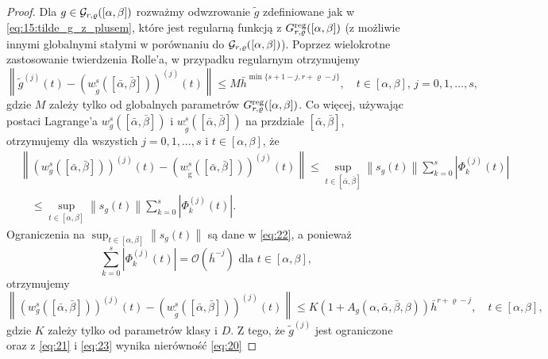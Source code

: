 \documentclass[oik, pdftex, robocza, man]{mgrwms}
\begin{document}
\begin{proof}
        Dla $g \in \mathcal{G}_{r,\varrho}([\alpha,\beta])$ rozważmy odwzrowanie $\tilde{g}$ zdefiniowane jak w \eqref{eq:15:tilde_g_z_plusem}, które jest regularną funkcją z $G_{r, \varrho}^{\mathrm{reg}}([\alpha, \beta])$ (z możliwie innymi globalnymi stałymi w porównaniu do $\mathcal{G}_{r,\varrho}([\alpha,\beta])$). Poprzez wielokrotne zastosowanie twierdzenia Rolle'a, w przypadku regularnym otrzymujemy
        \begin{equation} \label{eq:21}
            \left\|\tilde{g}^{(j)}(t)-\left(w_{\tilde{g}}^{s}([\bar{\alpha}, \bar{\beta}])\right)^{(j)}(t)\right\| \leq M \bar{h}^{\min \{s+1-j, r+\varrho-j\}}, \quad t \in[\alpha, \beta],\, j=0,1, \ldots, s,
        \end{equation}
        gdzie $M$ zależy tylko od globalnych parametrów $G_{r, \varrho}^{\mathrm{reg}}([\alpha, \beta])$. Co więcej, używając postaci Lagrange'a $w_{g}^{s}([\bar{\alpha}, \bar{\beta}])$ i $w_{\tilde{g}}^{s}([\bar{\alpha}, \bar{\beta}])$ na przdziale $[\bar{\alpha}, \bar{\beta}]$, otrzymujemy dla wszystich $j=0,1, \ldots, s$ i $t \in[\alpha, \beta]$, że
        \begin{equation*}
            \begin{aligned}
                &\left\|\left(w_{g}^{s}([\bar{\alpha}, \bar{\beta}])\right)^{(j)}(t)-\left(w_{\tilde{\mathrm{g}}}^{s}([\bar{\alpha}, \bar{\beta}])\right)^{(j)}(t)\right\| \leq \sup _{t \in[\bar{\alpha}, \bar{\beta}]}\left\|s_{g}(t)\right\| \sum_{k=0}^{s}\left|\Phi_{k}^{(j)}(t)\right| \\
                &\quad \leq \sup _{t \in[\alpha, \beta]}\left\|s_{g}(t)\right\| \sum_{k=0}^{s}\left|\Phi_{k}^{(j)}(t)\right|.
                \end{aligned}
        \end{equation*}
        Ograniczenia na $\displaystyle \sup _{t \in[\alpha, \beta]}\left\|s_{g}(t)\right\|$ są dane w \eqref{eq:22}, a ponieważ
        \begin{equation*}
            \sum_{k=0}^{s}\left|\Phi_{k}^{(j)}(t)\right|=\mathcal{O}\left(\bar{h}^{-j}\right) \text{ dla } t \in[\alpha, \beta],
        \end{equation*}
        otrzymujemy
        \begin{equation} \label{eq:23}
            \left\|\left(w_{g}^{s}([\bar{\alpha}, \bar{\beta}])\right)^{(j)}(t)-\left(w_{\tilde{g}}^{s}([\bar{\alpha}, \bar{\beta}])\right)^{(j)}(t)\right\| \leq K\left(1+A_{g}(\alpha, \bar{\alpha}, \bar{\beta}, \beta)\right) \bar{h}^{r+\varrho-j}, \quad t \in[\alpha, \beta],
        \end{equation}
        gdzie $K$ zależy tylko od parametrów klasy i $D$. Z tego, że $\tilde{g}^{(j)}$ jest ograniczone oraz z \eqref{eq:21} i \eqref{eq:23} wynika nierówność \eqref{eq:20}
    \end{proof}
\end{document}
